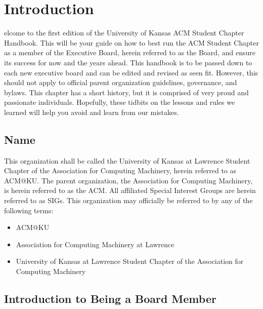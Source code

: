 %
%
\let\textcircled=\pgftextcircled
\chapter{Introduction}
\label{chap:intro}

elcome to the first edition of the University of Kansas ACM Student
Chapter Handbook. This will be your guide on how to best run the ACM Student
Chapter as a member of the Executive Board, herein referred to as the Board, and
ensure its success for now and the years ahead. This handbook is to be passed down
to each new executive board and can be edited and revised as seen fit. However,
this should not apply to official parent organization guidelines, governance,
and bylaws. This chapter has a short history, but it is comprised of very proud
and passionate individuals. Hopefully, these tidbits on the lessons and rules we
learned will help you avoid and learn from our mistakes.

\section{Name}
\label{sec:sec01}

This organization shall be called the University of Kansas at Lawrence Student
Chapter of the Association for Computing Machinery, herein referred to as ACM@KU.
The parent organization, the Association for Computing Machinery, is herein
referred to as the ACM. All affiliated Special Interest Groups are herein
referred to as SIGs. This organization may officially be referred to by any of
the following terms:
\begin{itemize}
  \item ACM@KU
  \item Association for Computing Machinery at Lawrence
  \item University of Kansas at Lawrence Student Chapter of the Association for
        Computing Machinery
\end{itemize}

\section{Introduction to Being a Board Member}
\label{sec:sec02}

%

